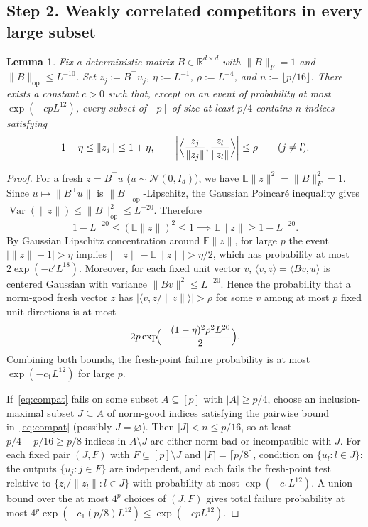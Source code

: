\documentclass[11pt]{article}
\theoremstyle{plain}
\newtheorem{lemma}[theorem]{Lemma}
\theoremstyle{definition}
\theoremstyle{remark}
\DeclareMathOperator{\Var}{Var}
\begin{document}
\subsection*{Step 2. Weakly correlated competitors in every large subset}

\begin{lemma}\label{lem:extract}
Fix a deterministic matrix $B \in \mathbb{R}^{d \times d}$ with $\|B\|_F = 1$ and $\|B\|_{\mathrm{op}} \le L^{-10}$. Set $z_j := B^\top u_j$, $\eta := L^{-1}$, $\rho := L^{-4}$, and $n := \lfloor p/16 \rfloor$. There exists a constant $c > 0$ such that, except on an event of probability at most $\exp(-c p L^{12})$, every subset of $[p]$ of size at least $p/4$ contains $n$ indices satisfying
\begin{equation}\label{eq:compat}
1 - \eta \le \|z_j\| \le 1 + \eta,
\qquad
\biggl|\Bigl\langle \frac{z_j}{\|z_j\|}, \frac{z_l}{\|z_l\|} \Bigr\rangle\biggr| \le \rho
\qquad (j \neq l).
\end{equation}
\end{lemma}

\begin{proof}
For a fresh $z = B^\top u$ ($u \sim \mathcal{N}(0, I_d)$), we have $\mathbb{E}\|z\|^2 = \|B\|_F^2 = 1$. Since $u \mapsto \|B^\top u\|$ is $\|B\|_{\mathrm{op}}$-Lipschitz, the Gaussian Poincar\'e inequality gives $\Var(\|z\|) \le \|B\|_{\mathrm{op}}^2 \le L^{-20}$. Therefore
\[
1 - L^{-20} \le (\mathbb{E}\|z\|)^2 \le 1 \implies \mathbb{E}\|z\| \ge 1 - L^{-20}.
\]
By Gaussian Lipschitz concentration around $\mathbb{E}\|z\|$, for large $p$ the event $|\|z\| - 1| > \eta$ implies $|\|z\| - \mathbb{E}\|z\|| > \eta/2$, which has probability at most $2\exp(-c' L^{18})$. Moreover, for each fixed unit vector $v$, $\langle v, z \rangle = \langle Bv, u \rangle$ is centered Gaussian with variance $\|Bv\|^2 \le L^{-20}$. Hence the probability that a norm-good fresh vector $z$ has $|\langle v, z/\|z\| \rangle| > \rho$ for some $v$ among at most $p$ fixed unit directions is at most
\[
2p \exp\!\Bigl(-\frac{(1 - \eta)^2 \rho^2 L^{20}}{2}\Bigr).
\]
Combining both bounds, the fresh-point failure probability is at most $\exp(-c_1 L^{12})$ for large $p$.

If~\eqref{eq:compat} fails on some subset $A \subseteq [p]$ with $|A| \ge p/4$, choose an inclusion-maximal subset $J \subseteq A$ of norm-good indices satisfying the pairwise bound in~\eqref{eq:compat} (possibly $J = \varnothing$). Then $|J| < n \le p/16$, so at least $p/4 - p/16 \ge p/8$ indices in $A \setminus J$ are either norm-bad or incompatible with $J$. For each fixed pair $(J, F)$ with $F \subseteq [p] \setminus J$ and $|F| = \lceil p/8 \rceil$, condition on $\{u_l : l \in J\}$: the outputs $\{u_j : j \in F\}$ are independent, and each fails the fresh-point test relative to $\{z_l / \|z_l\| : l \in J\}$ with probability at most $\exp(-c_1 L^{12})$. A union bound over the at most $4^p$ choices of $(J, F)$ gives total failure probability at most $4^p \exp(-c_1 (p/8) L^{12}) \le \exp(-c p L^{12})$.
\end{proof}
\end{document}
